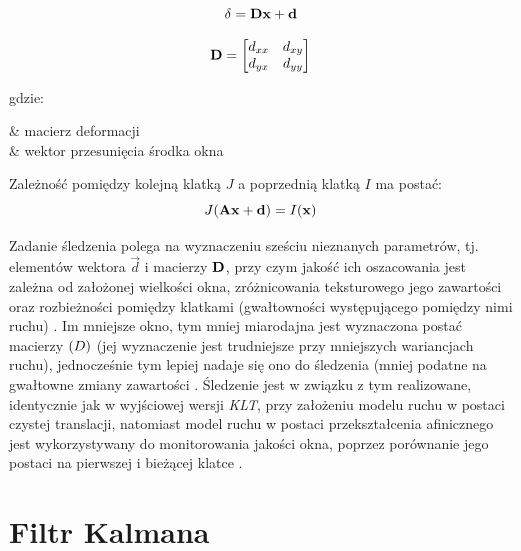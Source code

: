 \begin{equation}
\label{equ:Algorytmu_Lucasa_Kanade_Tomasi_Shi_model_afiniczny}
	\mathbf{\delta} = \mathbf{D}\mathbf{x} + \mathbf{d}
\end{equation}

\begin{equation}
\label{equ:Algorytmu_Lucasa_Kanade_Tomasi_Shi_macierz_deformacji}
	\mathbf{D} =
	\begin{bmatrix}
		d_{xx} & d_{xy} \\
		d_{yx} & d_{yy} \\	
	\end{bmatrix}
\end{equation}

\noindent
gdzie:
\begin{conditions}
	 & macierz deformacji \\
	 & wektor przesunięcia środka okna \\
\end{conditions}

Zależność pomiędzy kolejną klatką $J$ a poprzednią klatką $I$ ma postać:
\begin{equation}
\label{equ:Algorytmu_Lucasa_Kanade_Tomasi_Shi_zaleznosc_klatek}
	J(\mathbf{A}\mathbf{x} + \mathbf{d}) = I(\mathbf{x})
\end{equation}

Zadanie śledzenia polega na wyznaczeniu sześciu nieznanych parametrów, tj. elementów wektora $\vec{d}$ i macierzy $\mathbf{D}$, przy czym jakość ich oszacowania jest zależna od założonej wielkości okna, zróżnicowania teksturowego jego zawartości oraz rozbieżności pomiędzy klatkami (gwałtowności występującego pomiędzy nimi ruchu) \cite{Shi1994}. Im mniejsze okno, tym mniej miarodajna jest wyznaczona postać macierzy $\mathbf{(}D)$ (jej wyznaczenie jest trudniejsze przy mniejszych wariancjach ruchu), jednocześnie tym lepiej nadaje się ono do śledzenia (mniej podatne na gwałtowne zmiany zawartości \cite{Tomasi1991} \cite{Shi1994}. Śledzenie jest w związku z tym realizowane, identycznie jak w wyjściowej wersji \textit{KLT}, przy założeniu modelu ruchu w postaci czystej translacji, natomiast model ruchu w postaci przekształcenia afinicznego jest wykorzystywany do monitorowania jakości okna, poprzez porównanie jego postaci na pierwszej i bieżącej klatce \cite{Shi1994}.


\section{Filtr Kalmana}
\label{sec:Filtr_Kalmana}

